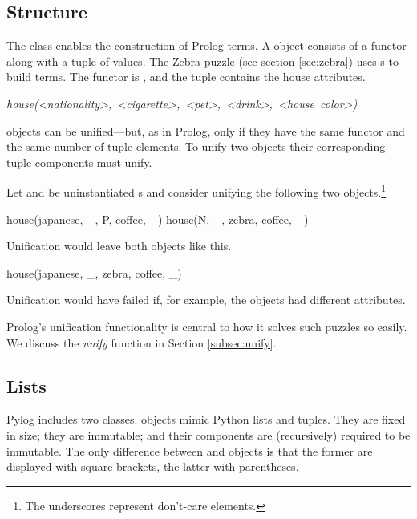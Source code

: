 \subsection{Structure}
The  class enables the construction of Prolog terms. A  object consists of a functor along with a tuple of values. The Zebra puzzle (see section \ref{sec:zebra}) uses s to build  terms. The functor is , and the tuple contains the house attributes. 

\centerline{\textit{house(\textless nationality\textgreater,~\textless cigarette\textgreater,~\textless pet\textgreater,~\textless drink\textgreater,~\textless house~color\textgreater)}}
\smallv

 objects can be unified---but, as in Prolog, only if they have the same functor and the same number of tuple elements. To unify two  objects their corresponding tuple components must unify. 
\smallv

Let  and  be uninstantiated s and consider unifying the following two  objects.\footnote{The underscores represent don't-care elements.} 
\begin{python}
   house(japanese, _, P, coffee, _)
   house(N, _, zebra, coffee, _)
\end{python}

Unification would leave both  objects like this.
\begin{python}
   house(japanese, _, zebra, coffee, _)
\end{python}

Unification would have failed if, for example, the  objects had different  attributes. 

Prolog's unification functionality is central to how it solves such puzzles so easily. We discuss the \textit{unify} function in Section \ref{subsec:unify}. 

\subsection{Lists}
Pylog includes two  classes.  objects mimic Python lists and tuples. They are fixed in size; they are immutable; and their components are (recursively) required to be immutable. The only difference between  and  objects is that the former are displayed with square brackets, the latter with parentheses.
\smallv

